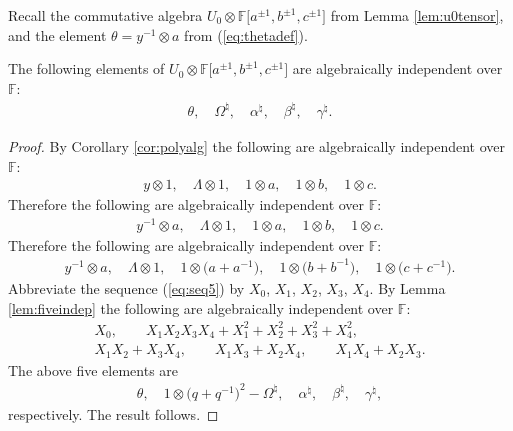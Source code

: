 Recall the commutative algebra
$U_0\otimes
\mathbb F \lbrack a^{\pm 1}, b^{\pm 1}, c^{\pm 1}\rbrack $
from
Lemma \ref{lem:u0tensor}, and the element
$\theta = y^{-1}\otimes a$ from
(\ref{eq:thetadef}).


\begin{Proposition}
\label{lem:algind}
The following elements of
$U_0\otimes
\mathbb F \lbrack a^{\pm 1}, b^{\pm 1}, c^{\pm 1}\rbrack $
are algebraically independent over $\mathbb F$:
\begin{gather*}
\theta, \quad \Omega^\natural,
\quad
\alpha^\natural,
\quad
\beta^\natural,
\quad
\gamma^\natural.
\end{gather*}
\end{Proposition}
\begin{proof}
By
 Corollary
\ref{cor:polyalg} the following are algebraically independent over
$\mathbb F$:
\begin{gather*}
y \otimes 1, \quad
\Lambda \otimes 1,
\quad
1 \otimes a,
\quad
1 \otimes b,
\quad
1 \otimes c.
\end{gather*}
Therefore the following are
algebraically independent over
$\mathbb F$:
\begin{gather*}
y^{-1} \otimes a, \quad
\Lambda \otimes 1,
\quad
1 \otimes a,
\quad
1 \otimes b,
\quad
1 \otimes c.
\end{gather*}
Therefore the following are
algebraically independent over
$\mathbb F$:
\begin{gather}
y^{-1} \otimes a, \quad
\Lambda \otimes 1,
\quad
1 \otimes \big(a+a^{-1}\big),
\quad
1 \otimes \big(b+b^{-1}\big),
\quad
1 \otimes \big(c+c^{-1}\big).
\label{eq:seq5}
\end{gather}
Abbreviate the sequence
(\ref{eq:seq5})
by
$X_0$, $X_1$, $X_2$, $X_3$, $X_4$.
By
Lemma
\ref{lem:fiveindep}
the following are
algebraically independent over
$\mathbb F$:
\begin{gather*}
 X_0,
\qquad
X_1X_2X_3X_4
+X_1^2+X_2^2+X_3^2+X_4^2,
\\
 X_1X_2+X_3X_4,
\qquad
 X_1X_3+X_2X_4,
\qquad
 X_1X_4+X_2X_3.
\end{gather*}
The
above f\/ive elements are
\begin{gather*}
\theta,
 \quad
 1\otimes \big(q+q^{-1}\big)^2 -
 \Omega^\natural,
\quad
\alpha^\natural,
\quad
\beta^\natural,
\quad
\gamma^\natural,
\end{gather*}
respectively. The result follows.
\end{proof}



